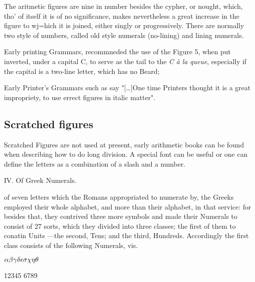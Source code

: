 \begin{multicols}{2}
The aritmetic figures are nine in number besides the cypher, or nought, which, tho' of itself it is of no significance, makes nevertheless a great increase in the figure to wj=hich it is joined, either singly or progressively. There are normally two style of numbers, called old style numerals (no-lining) and lining numerals.

{\Huge{}}

Early printing Grammars, recommneded the use of the Figure 5, when put inverted, under a capital C, to serve as the tail to the \textit{C \`a la queue}, especially if the capital is a two-line letter, which has no Beard;

Early  Printer's Grammars such as say "[\dots]One time Printers thought it is a great impropriety, to use errect figures in italic matter". 




\subsection*{Scratched figures}

 Scratched Figures are not used at present, early arithmetic books can be found when describing how to do long division. A special font can be useful or one can define the letters as a combination of a slash and a number.

\begin{center}\Large IV. Of Greek Numerals.\end{center}

 of seven letters which the Romans appropriated to numerate by, the Greeks employed their whole alphabet, and more than their alphabet, in that service: for besides that, they contrived three more symbols and made their Numerals to consist of 27 sorts, which they divided into three classes; the first of them to conatin Units ---the second, Tens; and the third, Hundreds. Accordingly the first class consists of the following Numerals, vis.

\medskip

\def\greeknumbers{\noindent $\hfil\alpha\hfil\beta\hfil\gamma\hfil\delta\hfil\epsilon \hfil\sigma\hfil\chi\hfil \eta\hfil \theta$\par}

\def\arithmeticfigures{\noindent\hfil 1\hfil 2\hfil 3\hfil 4\hfil 5 \hfil 6\hfil 7\hfil 8\hfil 9\par}

\greeknumbers


\arithmeticfigures
\end{multicols}



